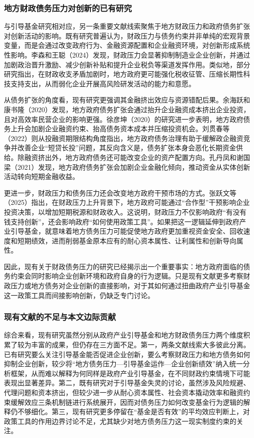 \documentclass[UTF8,a4paper,zihao=5,fontset=fandol]{ctexart}
\begin{document}
\subsubsection{地方财政债务压力对创新的已有研究}

与引导基金研究相对应，另一条重要文献线索聚焦于地方财政压力和政府债务扩张对创新活动的影响。既有研究普遍认为，财政压力与债务约束并非单纯的宏观背景变量，而是会通过改变政府行为、金融资源配置和企业融资环境，对创新形成系统性影响。李森和王聪（2024）发现，财政压力会显著抑制制造业企业创新，并通过加剧政治晋升激励、减少创新补贴和提升企业税负等渠道发挥作用。类似地，部分研究指出，在财政收支矛盾加剧时，地方政府更可能强化税收征管、压缩长期性科技支持支出，从而弱化企业开展高风险研发活动的能力和意愿。

从债务扩张的角度看，现有研究更强调其金融挤出效应与资源错配后果。余海跃和康书隆（2020）发现，地方政府债务扩张会通过抬升企业融资成本挤出企业投资，且对高效率民营企业的影响更强。徐彦坤（2020）的研究进一步表明，地方政府债务上升会加剧企业融资约束、抬高债务资本成本并压缩投资机会。刘贯春等（2022）则从投融资期限结构角度指出，地方政府债务治理有助于缓解政企融资竞争并改善企业“短贷长投”问题，其反向含义是，债务扩张本身会恶化长期资金供给。除融资挤出外，地方政府债务还可能改变企业的资产配置方向。孔丹凤和谢国梁（2021）发现，地方政府债务扩张会加剧企业金融化倾向，推动资金从实体创新活动转向短期金融收益。

更进一步，财政压力和债务压力还会改变地方政府干预市场的方式。张跃文等（2025）指出，在财政压力上升背景下，地方政府可能通过“合作型”干预影响企业投资决策，以增加短期税源和财政收入。这说明，财政压力不仅影响政府“有没有钱支持创新”，还会影响政府“如何使用政策工具”。如果把这一逻辑延伸到政府产业引导基金，就意味着地方债务压力可能促使地方政府更加重视资金安全、回收速度和短期绩效，进而削弱基金原本应有的耐心资本属性、让利属性和创新导向属性。

因此，现有关于财政债务压力的研究已经揭示出一个重要事实：地方政府面临的债务约束会同时影响企业创新环境和政府自身的行为逻辑。只是现有文献更多考察财政压力或地方债务对企业创新的直接影响，对于其如何通过扭曲政府产业引导基金这一政策工具而间接影响创新，仍缺乏专门讨论。

\subsubsection{现有文献的不足与本文边际贡献}

综合来看，现有研究虽然分别从政府产业引导基金和地方财政债务压力两个维度积累了较为丰富的成果，但仍存在三方面不足。第一，两条文献线索大多彼此分离。已有研究要么关注引导基金能否促进企业创新，要么考察财政压力和地方债务如何抑制企业创新，较少将“地方债务压力—引导基金运作—企业创新绩效”纳入统一分析框架，从而难以解释为何同样是政府产业引导基金，在不同财政约束情境下可能表现出显著差异。第二，既有研究对于引导基金失灵的讨论，虽然涉及风险规避、代理问题和资本挤出，但较少进一步从耐心资本属性、社会资本撬动效率和融资约束缓解效应三条机制链进行系统展开，因而对债务压力如何改变基金行为逻辑的解释仍不够细化。第三，现有研究更多停留在“基金是否有效”的平均效应判断上，对政策工具的作用边界讨论不足，尤其缺少对地方债务压力这一现实制度约束的关注。
\end{document}
